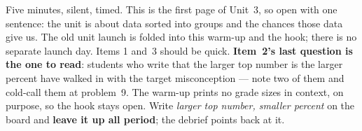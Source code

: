 \documentclass[10pt]{article}
\begin{document}
\begin{teachernote}[Warm-Up]
Five minutes, silent, timed. This is the first page of Unit~3, so open with one sentence: the
unit is about data sorted into groups and the chances those data give us. The old unit launch is
folded into this warm-up and the hook; there is no separate launch day. Items 1 and~3 should be
quick. \textbf{Item~2's last question is the one to read}: students who write that the larger
top number is the larger percent have walked in with the target misconception --- note two of
them and cold-call them at problem~9. The warm-up prints no grade sizes in context, on purpose,
so the hook stays open. Write \emph{larger top number, smaller percent} on the board and
\textbf{leave it up all period}; the debrief points back at it.
\end{teachernote}
\end{document}
